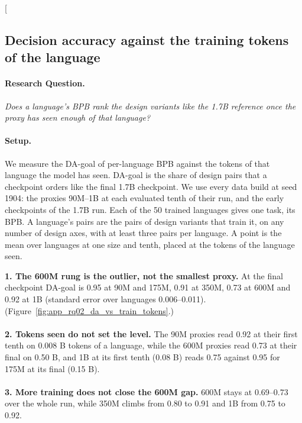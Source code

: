 \clearpage
\twocolumn[{%
\rqparent
\subsection{Decision accuracy against the training tokens of the language}
\label{app:rq02_da_vs_train_tokens}

\noindent\begin{minipage}[t]{0.485\textwidth}
\vspace{0pt}
\paragraph{Research Question.} \emph{Does a language's BPB rank the design variants like the 1.7B reference once the proxy has seen enough of that language?}

\paragraph{Setup.} We measure the DA-goal of per-language BPB against the tokens of that language the model has seen. DA-goal is the share of design pairs that a checkpoint orders like the final 1.7B checkpoint. We use every data build at seed 1904: the proxies 90M--1B at each evaluated tenth of their run, and the early checkpoints of the 1.7B run. Each of the 50 trained languages gives one task, its BPB. A language's pairs are the pairs of design variants that train it, on any number of design axes, with at least three pairs per language. A point is the mean over languages at one size and tenth, placed at the tokens of the language seen.
\end{minipage}\hfill
\begin{minipage}[t]{0.485\textwidth}
\vspace{0pt}
\begin{rqfinding}
\textbf{1. The 600M rung is the outlier, not the smallest proxy.} At the final checkpoint DA-goal is 0.95 at 90M and 175M, 0.91 at 350M, 0.73 at 600M and 0.92 at 1B (standard error over languages 0.006--0.011). (Figure~\ref{fig:app_rq02_da_vs_train_tokens}.)
\\
\\
\textbf{2. Tokens seen do not set the level.} The 90M proxies read 0.92 at their first tenth on 0.008 B tokens of a language, while the 600M proxies read 0.73 at their final on 0.50 B, and 1B at its first tenth (0.08 B) reads 0.75 against 0.95 for 175M at its final (0.15 B).
\\
\\
\textbf{3. More training does not close the 600M gap.} 600M stays at 0.69--0.73 over the whole run, while 350M climbs from 0.80 to 0.91 and 1B from 0.75 to 0.92.
\end{rqfinding}
\end{minipage}

}
